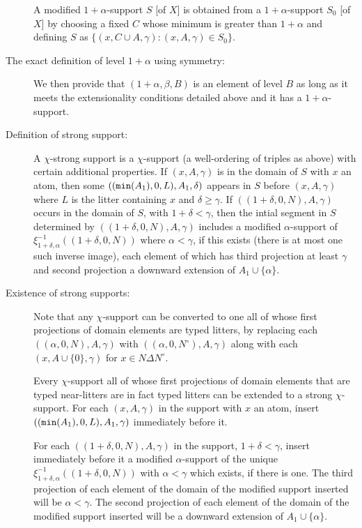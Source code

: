 \documentclass[12pt]{article}
\begin{document}
\begin{description}
A modified $1+\alpha$-support $S$ [of $X$] is obtained from a $1+\alpha$-support $S_0$ [of $X$] by choosing a fixed $C$ whose minimum is greater than $1+\alpha$ and defining $S$ as $\{(x,C \cup A,\gamma):(x,A,\gamma) \in S_0\}$.

\item[The exact definition of level $1+\alpha$ using symmetry:]

We then provide that $(1+\alpha,\beta,B)$ is an element of level $B$ as long as it meets the extensionality conditions detailed above and it has a $1+\alpha$-support.

\item[Definition of strong support:]

A $\chi$-strong support is a $\chi$-support (a well-ordering of triples as above) with certain additional properties.  If $(x,A,\gamma)$ is in the domain of $S$ with $x$ an atom, then some
$(({\tt min}(A_1),0,L),A_1,\delta)$ appears in $S$ before $(x,A,\gamma)$  where $L$ is the litter containing $x$ and $\delta \geq \gamma$.  If $((1+\delta,0,N),A,\gamma)$ occurs
in the domain of $S$, with $1+\delta<\gamma$, then the intial segment in $S$ determined by $((1+\delta,0,N),A,\gamma)$ includes a modified $\alpha$-support of $\xi_{1+\delta,\alpha}^{-1}((1+\delta,0,N))$ where $\alpha< \gamma$, if this exists (there is at most one such inverse image), each element of which has third projection at least $\gamma$ and second projection a downward extension of $A_1 \cup \{\alpha\}$.

\item[Existence of strong supports:]

Note that any $\chi$-support can be converted to one all of whose first projections of domain elements are typed litters, by replacing each $((\alpha,0,N),A,\gamma)$ with
$((\alpha,0,N^\circ),A,\gamma)$ along with each $(x,A\cup\{0\},\gamma)$ for $x \in N \Delta N^\circ$.

Every $\chi$-support all of whose first projections of domain elements that are typed near-litters are in fact typed litters can be extended to a strong $\chi$-support.  For each $(x,A,\gamma)$ in the support
with $x$ an atom, insert $(({\tt min}(A_1),0,L),A_1,\gamma)$ immediately before it.  

For each $((1+\delta,0,N),A,\gamma)$ in the support, $1+\delta<\gamma$, insert immediately before it a modified  $\alpha$-support of the unique $\xi_{1+\delta,\alpha}^{-1}((1+\delta,0,N))$ with $\alpha<\gamma$ which exists, if there is one.  The third projection of each element of the domain of the modified support inserted will be $\alpha<\gamma$.  The second projection of each
element of the domain of the modified support inserted will be a downward extension of $A_1 \cup \{\alpha\}$.


\end{description}
\end{document}

